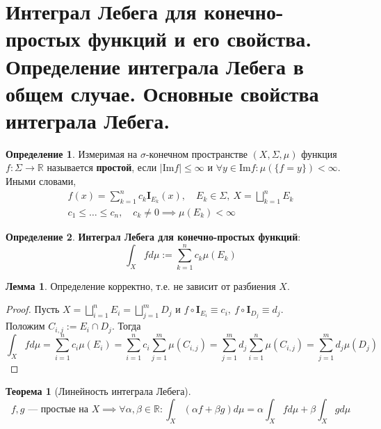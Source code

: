\documentclass[11pt,a4paper]{report}
\def\Real{\mathbb{R}}
\theoremstyle{definition}
\theoremstyle{definition}
\newtheorem{theorem}{Теорема}[section]
\newtheorem{lemma}{Лемма}[section]
\theoremstyle{definition}
\newtheorem{definition}{Определение}[section]
\begin{document}
	\section{Интеграл Лебега для конечно-простых функций и его свойства. Определение интеграла Лебега в общем случае. Основные свойства интеграла Лебега.}
		\begin{definition}
			Измеримая на $ \sigma $-конечном пространстве $ (X, \Sigma, \mu) $ функция $ f: \Sigma \to \Real $ называется \textbf{простой}, если $ |\mbox{Im} f| \le \infty $ и $ \forall y \in \mbox{Im} f: \mu(\{f = y\}) < \infty $. Иными словами, 
			\begin{gather*}
				f(x) = \sum_{k=1}^{n} c_{k} \mathbf{I}_{E_{k}}(x),\quad E_{k} \in \Sigma,\ X = \bigsqcup\limits_{k=1}^{n} E_{k}\\
				c_{1} \le \dots \le c_{n},\quad c_{k} \neq 0 \implies \mu(E_{k}) < \infty
			\end{gather*}
		\end{definition}
		\begin{definition}
			\textbf{Интеграл Лебега для конечно-простых функций}:
			\[ \int_{X} f d\mu := \sum_{k=1}^{n} c_{k} \mu(E_{k})  \]
		\end{definition}
		\begin{lemma}
			Определение корректно, т.е. не зависит от разбиения $ X $.
		\end{lemma}
		\begin{proof}
			Пусть $ X = \bigsqcup\limits_{i=1}^{n} E_{i} = \bigsqcup\limits_{j=1}^{m} D_{j} $ и $ f \circ \mathbf{I}_{E_{i}} \equiv c_{i},\ f \circ \mathbf{I}_{D_{j}} \equiv d_{j} $.\\ 
			Положим $ C_{i, j} := E_{i} \cap D_{j} $. Тогда 
			\[ \int_{X} f d\mu = \sum\limits_{i=1}^{n} c_{i} \mu(E_{i})  = \sum\limits_{i=1}^{n} c_{i} \sum\limits_{j=1}^{m} \mu(C_{i, j}) = \sum\limits_{j=1}^{m} d_{j} \sum\limits_{i=1}^{n} \mu(C_{i, j}) = \sum\limits_{j=1}^{m} d_{j} \mu(D_{j}) \]
		\end{proof}
		\begin{theorem}[Линейность интеграла Лебега]$  $\\
			\[ f, g \text{ — простые на } X \implies \forall \alpha, \beta \in \Real: \int_{X} (\alpha f + \beta g) d\mu = \alpha \int_{X} f d\mu + \beta \int_{X} g d\mu \] 
		\end{theorem}
\end{document}
